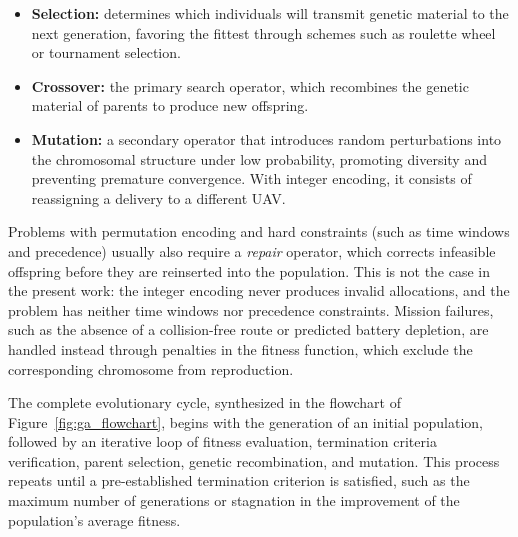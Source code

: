 \begin{itemize}
    \item \textbf{Selection:} determines which individuals will transmit genetic material to the next generation, favoring the fittest through schemes such as roulette wheel or tournament selection.
    \item \textbf{Crossover:} the primary search operator, which recombines the genetic material of parents to produce new offspring.
    \item \textbf{Mutation:} a secondary operator that introduces random perturbations into the chromosomal structure under low probability, promoting diversity and preventing premature convergence. With integer encoding, it consists of reassigning a delivery to a different UAV.
\end{itemize}

Problems with permutation encoding and hard constraints (such as time windows and precedence) usually also require a \textit{repair} operator, which corrects infeasible offspring before they are reinserted into the population. This is not the case in the present work: the integer encoding never produces invalid allocations, and the problem has neither time windows nor precedence constraints. Mission failures, such as the absence of a collision-free route or predicted battery depletion, are handled instead through penalties in the fitness function, which exclude the corresponding chromosome from reproduction.

The complete evolutionary cycle, synthesized in the flowchart of Figure~\ref{fig:ga_flowchart}, begins with the generation of an initial population, followed by an iterative loop of fitness evaluation, termination criteria verification, parent selection, genetic recombination, and mutation. This process repeats until a pre-established termination criterion is satisfied, such as the maximum number of generations or stagnation in the improvement of the population's average fitness.

